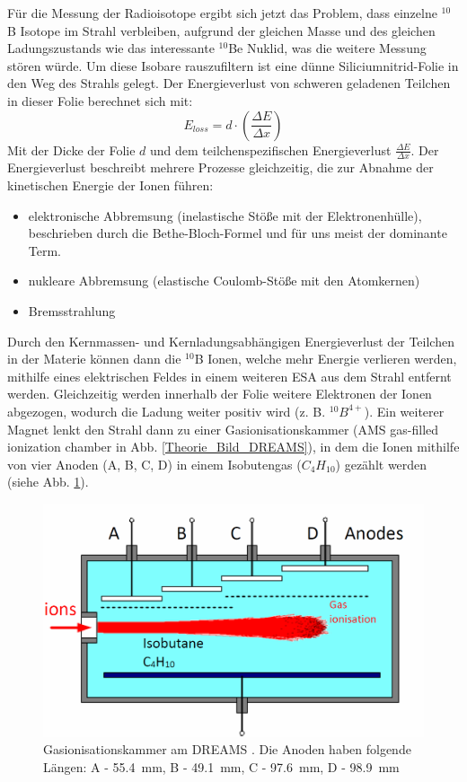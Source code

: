 Für die Messung der Radioisotope ergibt sich jetzt das Problem, dass einzelne $^{10}$B Isotope im Strahl verbleiben, aufgrund der gleichen Masse und des gleichen Ladungszustands wie das interessante $^{10}$Be Nuklid, was die weitere Messung stören würde.
Um diese Isobare rauszufiltern ist eine dünne Siliciumnitrid-Folie in den Weg des Strahls gelegt.
Der Energieverlust von schweren geladenen Teilchen in dieser Folie berechnet sich mit:
\begin{equation}
E_{loss} = d \cdot \left( \frac{\Delta E}{\Delta x} \right)
\end{equation}
Mit der Dicke der Folie $d$ und dem teilchenspezifischen Energieverlust $\frac{\Delta E}{\Delta x}$.
Der Energieverlust beschreibt mehrere Prozesse gleichzeitig, die zur Abnahme der kinetischen Energie der Ionen führen:
\begin{itemize}
    \item elektronische Abbremsung (inelastische Stöße mit der Elektronenhülle), beschrieben durch die Bethe-Bloch-Formel und für uns meist der dominante Term.
    \item nukleare Abbremsung (elastische Coulomb-Stöße mit den Atomkernen)
    \item Bremsstrahlung
\end{itemize}
Durch den Kernmassen- und Kernladungsabhängigen Energieverlust der Teilchen in der Materie können dann die $^{10}$B Ionen, welche mehr Energie verlieren werden, mithilfe eines elektrischen Feldes in einem weiteren ESA aus dem Strahl entfernt werden.
Gleichzeitig werden innerhalb der Folie weitere Elektronen der Ionen abgezogen, wodurch die Ladung weiter positiv wird (z. B. $^{10}B^{4+}$).
Ein weiterer Magnet lenkt den Strahl dann zu einer Gasionisationskammer (AMS gas-filled ionization chamber in Abb. \ref{Theorie_Bild_DREAMS}), in dem die Ionen mithilfe von vier Anoden (A, B, C, D) in einem Isobutengas ($C_{4}H_{10}$) gezählt werden (siehe Abb. \ref{Theorie_ion_chamber}).
\begin{figure}[ht]
  \includegraphics[width=0.95\linewidth]{../Bilder/ion_chamber.png}
  \caption{Gasionisationskammer am DREAMS \cite{Bild_Ionisationskammer}. Die Anoden haben folgende Längen: A - \SI{55.4}{\milli\metre}, B - \SI{49.1}{\milli\metre}, C - \SI{97.6}{\milli\metre}, D - \SI{98.9}{\milli\metre}}
  \label{Theorie_ion_chamber}
\end{figure}
\clearpage
